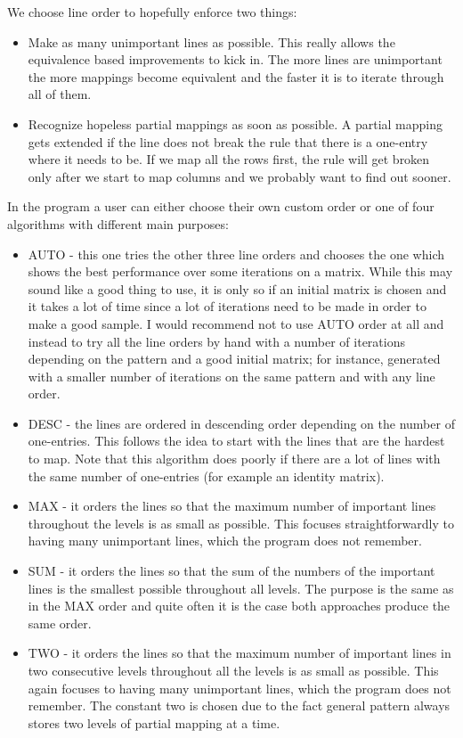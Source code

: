 We choose line order to hopefully enforce two things:
\begin{itemize}
\item Make as many unimportant lines as possible. This really allows the equivalence based improvements to kick in. The more lines are unimportant the more mappings become equivalent and the faster it is to iterate through all of them.
\item Recognize hopeless partial mappings as soon as possible. A partial mapping gets extended if the line does not break the rule that there is a one-entry where it needs to be. If we map all the rows first, the rule will get broken only after we start to map columns and we probably want to find out sooner.\\
\end{itemize}
In the program a user can either choose their own custom order or one of four algorithms with different main purposes:
\begin{itemize}
\item AUTO - this one tries the other three line orders and chooses the one which shows the best performance over some iterations on a matrix. While this may sound like a good thing to use, it is only so if an initial matrix is chosen and it takes a lot of time since a lot of iterations need to be made in order to make a good sample. I would recommend not to use AUTO order at all and instead to try all the line orders by hand with a number of iterations depending on the pattern and a good initial matrix; for instance, generated with a smaller number of iterations on the same pattern and with any line order.
\item DESC - the lines are ordered in descending order depending on the number of one-entries. This follows the idea to start with the lines that are the hardest to map. Note that this algorithm does poorly if there are a lot of lines with the same number of one-entries (for example an identity matrix).
\item MAX - it orders the lines so that the maximum number of important lines throughout the levels is as small as possible. This focuses straightforwardly to having many unimportant lines, which the program does not remember.
\item SUM - it orders the lines so that the sum of the numbers of the important lines is the smallest possible throughout all levels. The purpose is the same as in the MAX order and quite often it is the case both approaches produce the same order.
\item TWO - it orders the lines so that the maximum number of important lines in two consecutive levels throughout all the levels is as small as possible. This again focuses to having many unimportant lines, which the program does not remember. The constant two is chosen due to the fact general pattern always stores two levels of partial mapping at a time.
\end{itemize}

